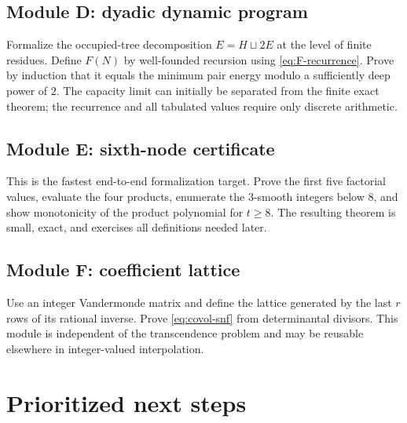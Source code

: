 \documentclass[11pt]{article}
\theoremstyle{definition}
\theoremstyle{remark}
\begin{document}
\subsection{Module D: dyadic dynamic program}
Formalize the occupied-tree decomposition $E=H\sqcup2E$ at the level of finite residues.  Define $F(N)$ by well-founded recursion using \eqref{eq:F-recurrence}.  Prove by induction that it equals the minimum pair energy modulo a sufficiently deep power of $2$.  The capacity limit can initially be separated from the finite exact theorem; the recurrence and all tabulated values require only discrete arithmetic.

\subsection{Module E: sixth-node certificate}
This is the fastest end-to-end formalization target.  Prove the first five factorial values, evaluate the four products, enumerate the $3$-smooth integers below $8$, and show monotonicity of the product polynomial for $t\ge8$.  The resulting theorem is small, exact, and exercises all definitions needed later.

\subsection{Module F: coefficient lattice}
Use an integer Vandermonde matrix and define the lattice generated by the last $r$ rows of its rational inverse.  Prove \eqref{eq:covol-snf} from determinantal divisors.  This module is independent of the transcendence problem and may be reusable elsewhere in integer-valued interpolation.

\section{Prioritized next steps}
\end{document}
